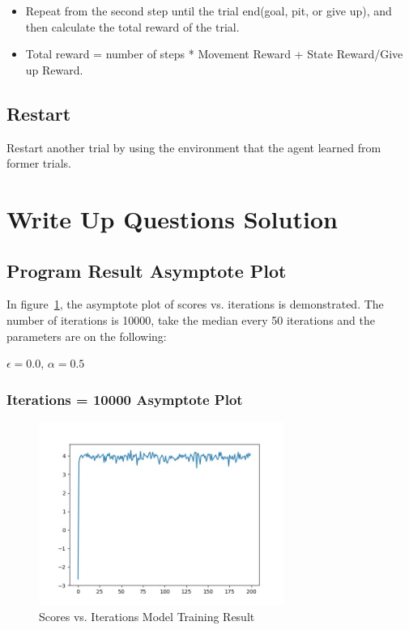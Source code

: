 \documentclass[11pt, a4paper]{article}
\begin{document}
\begin{itemize}
\item Repeat from the second step until the trial end(goal, pit, or give up), and then calculate the total reward of the trial.
	
\item Total reward = number of steps * Movement Reward + State Reward/Give up Reward.
	
\end{itemize}

\subsection{Restart}

Restart another trial by using the environment that the agent learned from former trials.

\section{Write Up Questions Solution}


\subsection{Program Result Asymptote Plot}

In figure~\ref{fig:1_1}, the asymptote plot of scores vs. iterations is demonstrated. The number of iterations is 10000, take the median every 50 iterations and the parameters are on the following:

$\epsilon = 0.0$, $\alpha = 0.5$ 

\subsubsection{Iterations = 10000 Asymptote Plot} 

 \begin{figure}[htbp] 
	\begin{center}
		\includegraphics[width=8cm]{1_1W} 
		\caption{Scores vs. Iterations Model Training Result} 
		\label{fig:1_1}
	\end{center}
\end{figure}
\end{document}
